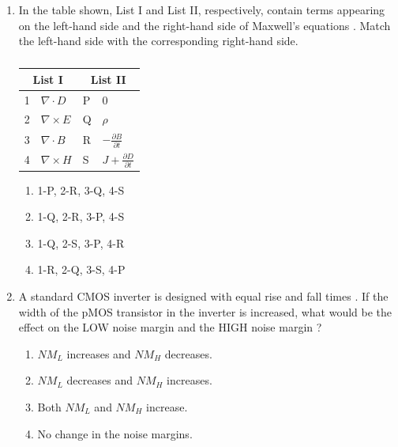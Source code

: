 \documentclass[a4paper, 11pt]{article}
\begin{document}
\begin{enumerate}
    \hfill{}
    
    \item In the table shown, List I and List II, respectively, contain terms appearing on the left-hand side and the right-hand side of Maxwell's equations . Match the left-hand side with the corresponding right-hand side.
    
    \begin{table}[H]
    \centering
    \begin{tabular}{|l|l|l|l|}
        \hline
        \multicolumn{2}{|c|}{\textbf{List I}} & \multicolumn{2}{c|}{\textbf{List II}} \\
        \hline
        1 & $\nabla \cdot D$ & P & 0 \\
        \hline
        2 & $\nabla \times E$ & Q & $\rho$ \\
        \hline
        3 & $\nabla \cdot B$ & R & $-\frac{\partial B}{\partial t}$ \\
        \hline
        4 & $\nabla \times H$ & S & $J + \frac{\partial D}{\partial t}$ \\
        \hline
    \end{tabular}
    \caption*{}
    \label{tab:q12}
    \end{table}

    \begin{enumerate}
        \item 1-P, 2-R, 3-Q, 4-S
        \item 1-Q, 2-R, 3-P, 4-S
        \item 1-Q, 2-S, 3-P, 4-R
        \item 1-R, 2-Q, 3-S, 4-P
    \end{enumerate}
    
    \hfill{}

    \item A standard CMOS inverter is designed with equal rise and fall times . If the width of the pMOS transistor in the inverter is increased, what would be the effect on the LOW noise margin  and the HIGH noise margin ?
    
    \begin{enumerate}
        \item $NM_{L}$ increases and $NM_{H}$ decreases.
        \item $NM_{L}$ decreases and $NM_{H}$ increases.
        \item Both $NM_{L}$ and $NM_{H}$ increase.
        \item No change in the noise margins.
    \end{enumerate}


\end{enumerate}
\end{document}
